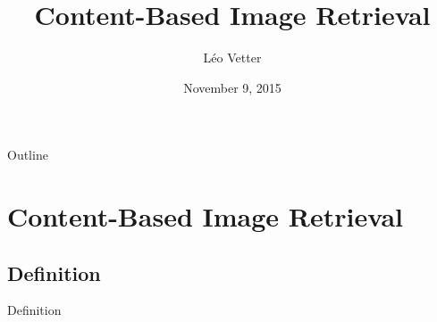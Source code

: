 \documentclass{beamer}
\title{Content-Based Image Retrieval}
\author{Léo Vetter}
\date{November 9, 2015}
\institute[Passau University and INSA Lyon] %
{
  \inst{1}%
  Department of Computer Science\\
  University of Passau
  \and
  \inst{2}%
  IT Department\\
  INSA Lyon}
\begin{document}
\begin{frame}
  \titlepage
\end{frame}

\begin{frame}{Outline}
  \tableofcontents
\end{frame}

\section{Content-Based Image Retrieval}

  \subsection{Definition}

    \begin{frame}{Definition}


\end{frame}
\end{document}

